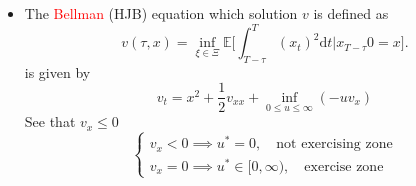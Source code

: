 \documentclass[11pt, aspectratio=169]{beamer}
\theoremstyle{plain}
\begin{document}
\begin{frame}
  \begin{itemize}
    \item The \textcolor{red}{Bellman} (HJB) equation which solution $v$ is defined as
    \begin{equation*}
      v(\tau,x)= \inf_{\xi \in \Xi} \mathbb{E} \Bigg[ \int_{T-\tau}^T (x_t)^2 \mathrm{d}t \Bigg | x_{T-\tau }0=x \Bigg].
    \end{equation*}
    is given by 
    \begin{equation*}
      v_t = x^2 + \frac{1}{2}v_{xx}+\inf_{0\leq u \leq \infty} (- u v_x)
    \end{equation*}
    See that $v_x \leq 0$ 
    \begin{equation*}
      \begin{cases}
        v_x < 0 \implies u^* = 0, \quad \text{not exercising zone}\\ 
        v_x = 0 \implies u^* \in [0,\infty), \quad \text{exercise zone} 
      \end{cases}
    \end{equation*}
  \end{itemize}
\end{frame}


\begin{frame}
\end{frame}
\end{document}
